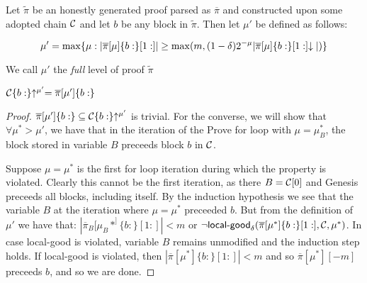 %
%

Let $\tilde\pi$ be an honestly generated proof parsed as $\overline\pi$ and constructed upon some adopted chain $\mathcal{C}$ and let $b$ be any block in
$\tilde\pi$. Then let $\mu'$ be defined as follows:

\begin{equation*}
\mu' = \max\{\mu: |\overline\pi[\mu]\{b:\}[1:]| \geq \max(m, (1 - \delta)2^{-\mu}|\overline\pi[\mu]\{b:\}[1:]\negthickspace\downarrow|)\}
\end{equation*}

We call $\mu'$ the \textit{full} level of proof $\tilde\pi$

\begin{lemma}
$\mathcal{C}\{b:\}\negthickspace\uparrow^{\mu'} = \overline\pi[\mu']\{b:\}$
\end{lemma}
\begin{proof}
    $\overline\pi[\mu']\{b:\} \subseteq \mathcal{C}\{b:\}\negthickspace\uparrow^{\mu'}$ is trivial.
    For the converse, we will show that $\forall \mu^* > \mu'$, we have that in
    the iteration of the Prove for loop with $\mu = \mu_B^*$, the block stored in variable $B$ preceeds block $b$
    in $\mathcal{C}$.

    Suppose $\mu = \mu^*$ is the first for loop iteration during which the
    property is violated. Clearly this cannot be the first iteration, as there
    $B = \mathcal{C}[0]$ and Genesis preceeds all blocks, including itself. By the
    induction hypothesis we see that the variable $B$ at the iteration where
    $\mu = \mu^*$ preceeded $b$. But from the definition of $\mu'$ we have that:
    $|\overline\pi_B[\mu_B*^]\{b:\}[1:]| < m$ or $\lnot
    \textsf{local-good}_\delta(\overline\pi[\mu^*]\{b:\}[1:], \mathcal{C}, \mu^*)$.
    In case \textsf{local-good} is violated, variable $B$ remains unmodified and
    the induction step holds. If \textsf{local-good} is violated, then
    $|\overline\pi[\mu^*]\{b:\}[1:]| < m$ and so $\overline\pi[\mu^*][-m]$
    preceeds $b$, and so we are done.
\end{proof}


